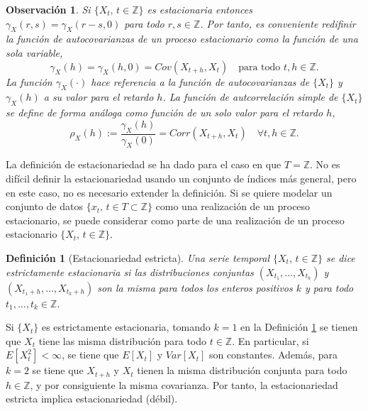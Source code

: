 \documentclass[12pt,twoside]{article}
\newtheorem{definition}[theorem]{Definición}
\newtheorem{remark}[theorem]{Observación}
\begin{document}
\begin{remark}
    Si $\{X_t, \,t \in \mathbb{Z}\}$ es estacionaria entonces $\gamma_X(r,s) = \gamma_X(r-s,0)$ para todo $r,s \in \mathbb{Z}$. Por tanto, es conveniente redifinir la función de autocovarianzas de un proceso estacionario como la función de una sola variable,
    \begin{equation*}
        \gamma_X(h) = \gamma_X(h,0) = Cov(X_{t+h}, X_t) \quad \text{para todo } t,h \in \mathbb{Z}.
    \end{equation*}
La función $\gamma_X(\cdot)$ hace referencia a la función de autocovarianzas de $\{X_t\}$ y $\gamma_X(h)$ a su valor para el retardo $h$. La función de autcorrelación simple de $\{X_t\}$ se define de forma análoga como función de un solo valor para el retardo $h$,
\begin{equation*}
    \rho_X(h) := \frac{\gamma_X(h)}{\gamma_X(0)} = Corr(X_{t+h}, X_t) \quad \forall t,h \in \mathbb{Z}.
\end{equation*}
\end{remark}


La definición de estacionariedad se ha dado para el caso en que $T = \mathbb{Z}$. No es difícil definir la estacionariedad usando un conjunto de índices más general, pero en este caso, no es necesario extender la definición. Si se quiere modelar un conjunto de datos $\{x_t, \, t\in T \subset \mathbb{Z}\}$ como una realización de un proceso estacionario, se puede considerar como parte de una realización de un proceso estacionario $\{X_t, \, t \in \mathbb{Z}\}$.


\begin{definition}[Estacionariedad estricta]\label{def:strictly_stationary}
    Una serie temporal $\{X_t, \,t \in \mathbb{Z}\}$ se dice estrictamente estacionaria si las distribuciones conjuntas $(X_{t_1}, \dotsc, X_{t_k})$ y $(X_{t_1+h}, \dotsc, X_{t_k+h})$ son la misma para todos los enteros positivos $k$ y para todo $t_1, \dotsc, t_k \in \mathbb{Z}$. 
\end{definition}

Si $\{X_t\}$ es estrictamente estacionaria, tomando $k=1$ en la Definición \ref{def:strictly_stationary} se tienen que $X_t$ tiene las misma distribución para todo $t \in \mathbb{Z}$. En particular, si $E[X_t^2] < \infty$, se tiene que $E[X_t]$ y $Var[X_t]$ son constantes. Además, para $k=2$ se tiene que $X_{t+h}$ y $X_t$ tienen la misma distribución conjunta para todo $h\in\mathbb{Z}$, y por consiguiente la misma covarianza. Por tanto, la estacionariedad estricta implica estacionariedad (débil).
\end{document}
